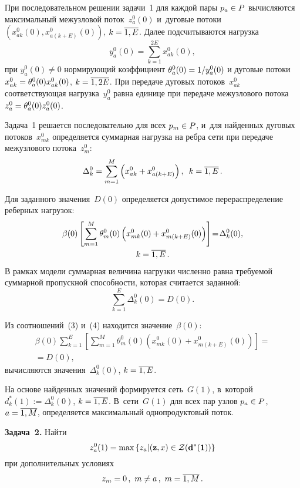 \begin{multicols}{2}
При последовательном решении задачи~1 для каждой пары $p_a \hm\in P$ вычисляются максимальный межузловой поток~$z_a^0 (0)$ и~дуговые 
потоки  $(x_{ak}^0(0), x_{a(k+E)}^0(0))$, $k \hm= \ol{1, E}$. Далее подсчитываются  нагрузка
$$ 
y_a^0(0) = \sum\limits_{k=1}^{2E} x_{ak}^0(0), 
$$
при $y_a^0(0)\not= 0$  нормирующий коэффициент
$ \theta_a^0(0) \hm=  1/y_a^0(0)$
и дуговые потоки $x_{ak}^0 \hm= \theta_a^0(0) x_{ak}^0(0)$, $k \hm= \ol{1, 2E}$.
При передаче дуговых потоков~$x_{ak}^0$ соответствующая нагрузка~$y_a^0$ равна единице при передаче межузлового потока
 $z_a^0 \hm= \theta_a^0(0) z_a^0(0) $.

Задача~1 решается последовательно для всех $p_m \hm\in P$, и~для найденных дуговых потоков~$x_{mk}^0$ 
определяется суммарная нагрузка на ребра сети при передаче межузлового потока~$z_m^0$:
$$
\Delta_k^0 = \sum\limits_{m=1}^{M} \left(x_{ak}^0 + x_{a(k+E)}^0\right), \enskip   k= \overline{1, E}\,.
$$

Для заданного значения~$D(0)$ определяется допустимое перераспределение реберных нагрузок:
\begin{multline}
\beta(0) \left[ \sum\limits_{m=1}^{M} \theta_m^0(0) \left(x_{mk}^0(0)+ x_{m(k+E)}^0(0)\right) \right]\!  =\! \Delta_k^0(0),\\
 k= \overline{1, E}\,.
\label{e3-mal}
\end{multline}
В рамках модели суммарная величина нагрузки численно равна требуемой суммарной пропускной способности, которая считается заданной:
\begin{equation}
\sum\limits_{k=1}^{E} \Delta_k^0(0) = D(0). 
\label{e4-mal}
\end{equation}

Из соотношений~(3) и~(4) находится значение~$\beta(0)$:
\begin{multline*}
 \beta(0) \sum\limits_{k=1}^{E} \left[ \sum\limits_{m=1}^{M} \theta_m^0(0) \left(x_{mk}^0(0)+ x_{m(k+E)}^0(0)\right) \right]  ={}\\
 {}= D(0), 
 \end{multline*}
вычисляются значения~$\Delta_k^0(0)$, $k\hm= \ol{1, E}$.

На основе найденных значений формируется сеть~$G(1)$, в~которой $d_k^*(1) := \Delta_k^0(0)$, $k\hm= \ol{1, E}$. 
В~сети~$G(1)$ для всех пар узлов $p_a \hm\in P$, $a \hm= \ol{1, M}$, определяется максимальный однопродуктовый поток.

\smallskip

\noindent
\textbf{Задача~2.} Найти 
$$
 z_a^0 (1) = \max \left\{ z_a | (\mathbf{z}, x)  \hm\in \mathcal{Z}(\mathbf{d^*(1)})\right\} 
 $$
{при дополнительных условиях }
$$z_m = 0\,,\ m \not = a\,,\ m = \ol {1, M}\,. 
$$


\end{multicols}
